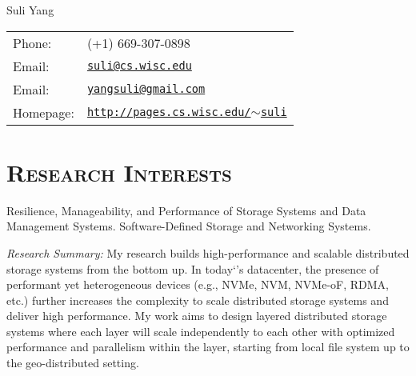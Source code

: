 \documentclass[10pt, letterpaper]{article}
\def\name{Suli Yang}
\begin{document}
{\huge \name}

\bigskip

\begin{minipage}{0.45\linewidth}
\hypersetup{urlcolor=black}
\begin{tabular}{ll}
  Phone: & (+1) 669-307-0898\\
  Email: & \href{mailto:suli@cs.wisc.edu}{\tt suli@cs.wisc.edu}\\
  Email: & \href{mailto:yangsuli@gmail.com}{\tt yangsuli@gmail.com}\\
  Homepage: & \href{http://pages.cs.wisc.edu/~suli}
  	{\tt http://pages.cs.wisc.edu/$\sim$suli}
\end{tabular}
\end{minipage}

\section*{\textsc{Research Interests}}

Resilience, Manageability, and Performance of Storage Systems and Data Management Systems.
Software-Defined Storage and Networking Systems.

\vspace{0.15cm}
\noindent
{\textit{Research Summary:}} 
    My research builds high-performance and scalable distributed storage systems from the bottom up. 
    In today`’s datacenter, the presence of performant yet heterogeneous devices (e.g., NVMe, NVM, NVMe-oF, RDMA, etc.) further increases the complexity to scale distributed storage systems and deliver high performance. My work aims to design layered distributed storage systems where each layer will scale independently to each other with optimized performance and parallelism within the layer, starting from local file system up to the geo-distributed setting. 
    
\fi
\end{document}
